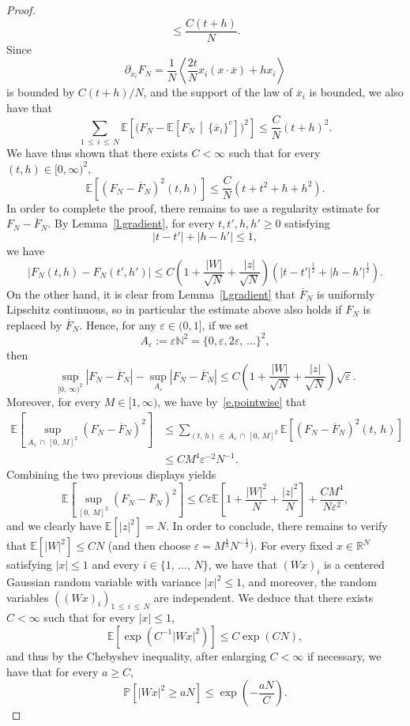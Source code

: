\documentclass[AHL,Unicode,longabstracts,published]{cedram}
\newcommand{\N}{\mathbb{N}}
\newcommand{\R}{\mathbb{R}}
\newcommand{\E}{\mathbb{E}}
\renewcommand{\P}{\mathbb{P}}
\newcommand{\1}{\mathds{1}}
\newcommand{\ep}{\varepsilon}
\newcommand{\eps}{\varepsilon}
\renewcommand{\le}{\leqslant}
\renewcommand{\ge}{\geqslant}
\newcommand{\la}{\left\langle}
\newcommand{\ra}{\right\rangle}
\renewcommand{\bar}{\overline}
\begin{document}
\begin{proof}
\[\le \frac{C (t+h)}{N}.
\]
Since
\[
\partial_{\bar x_i} F_N = \frac 1 N \la \frac {2t} N x_i \left(x \cdot \bar x \right) + hx_i\ra
\]
is bounded by $C(t+h)/N$, and the support of the law of $\bar x_i$ is bounded, we also have that
\[
\sum_{1\,\le\,i\,\le\,N} \E \left[\big(F_N - \E\left[F_N \, \middle| \, \{\bar x_{i}\}^c\right] \big)^2 \right]\le \frac{C}N(t+h)^2.
\]
We have thus shown that there exists $C < \infty$ such that for every $(t,h) \in [0,\infty)^2$,
\begin{equation}\label{e.pointwise}
\E \left[\left(F_N - \bar F_N \right)^2 (t,h) \right] \le \frac{C}{N}\left(t+t^2 + h+h^2\right).
\end{equation}
In order to complete the proof, there remains to use a regularity estimate for $F_N - \bar F_N$. By Lemma~\ref{l.gradient}, for every $t,t',h,h' \ge 0$ satisfying
\[
\left|t-t'\right| + \left|h-h'\right| \le 1,
\]
we have
\[
\left|F_N(t,h) - F_N(t',h')\right| \le C \left(1 + \frac{|W|}{\sqrt{N}} + \frac{|z|}{\sqrt{N}} \right) \left(\left|t-t'\right|^\frac 1 2 + \left|h-h'\right|^\frac 1 2 \right).
\]
On the other hand, it is clear from Lemma~\ref{l.gradient} that $\bar F_N$ is uniformly Lipschitz continuous, so in particular the estimate above also holds if $F_N$ is replaced by $\bar F_N$. Hence, for any $\eps \in (0,1]$, if we set
\[
A_\ep := \ep \N^2 = \{0,\ep, 2\ep,\,\ldots\}^2,
\]
then
\[
\sup_{[0,\,\infty)^2} \left|F_N - \bar F_N\right| - \sup_{A_\ep} \left|F_N - \bar F_N\right| \le C \left(1 + \frac{|W|}{\sqrt{N}} + \frac{|z|}{\sqrt{N}} \right) \sqrt{\ep}.
\]
Moreover, for every $M \in [1,\infty)$, we have by~\eqref{e.pointwise} that
\begin{align*}
\E \left[\sup_{A_\ep\,\cap\,[0,\,M]^2} \left(F_N - \bar F_N\right)^2\right] & \le \sum_{(t,\,h)\,\in\,A_\ep\,\cap\,[0,\,M]^2} \E \left[\left(F_N - \bar F_N\right)^2(t,\,h) \right]
\\
& \le C M^4 \ep^{-2} N^{-1}.
\end{align*}
Combining the two previous displays yields
\[
\E \left[\sup_{\left[0,\,M\right]^2} \left(F_N - \bar F_N\right)^2 \right] \le C \ep \E \left[1 + \frac{|W|^2}{{N}} + \frac{|z|^2}{{N}} \right] + \frac{C M^4}{N\ep^2},
\]
and we clearly have $\E[|z|^2] = N$. In order to conclude, there remains to verify that $\E[|W|^2] \le C N$ (and then choose $\ep = M^\frac 4 3 N^{-\frac 13}$). For every fixed $x \in \R^N$ satisfying $|x| \le 1$ and every $i \in \{1,\,\ldots,\,N\}$, we have that $(Wx)_i$ is a centered Gaussian random variable with variance $|x|^2 \le 1$, and moreover, the random variables $((Wx)_i)_{1\,\le\,i\,\le\,N}$ are independent. We deduce that there exists $C < \infty$ such that for every $|x| \le 1$,
\[
\E \left[\exp \left(C^{-1} \left|Wx\right|^2 \right) \right] \le C\exp \left(C N \right),
\]
and thus by the Chebyshev inequality, after enlarging $C < \infty$ if necessary, we have that for every $a \ge C$,
\[
\P \left[\left|Wx\right|^2 \ge aN \right] \le \exp \left(-\frac{aN}{C} \right).
\]


\end{proof}
\end{document}
